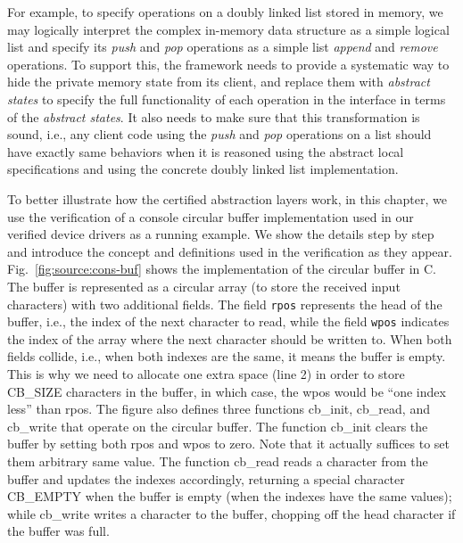 For example, to specify operations on a doubly
linked list stored in memory, we may logically interpret the complex in-memory
data structure as a simple logical list and specify its {\em push} and {\em pop}
operations as a simple list {\em append} and {\em remove} operations. To support
this, the framework needs to provide a systematic way to hide the private memory
state from its client, and replace them with {\em abstract states} to specify
the full functionality of each operation in the interface in terms of the {\em
abstract states}. It also needs to make sure that this transformation is
sound, i.e., any client code using the {\em push} and {\em pop} operations
on a list should have exactly same behaviors when it is reasoned using the
abstract local specifications and using the concrete doubly linked list
implementation.



To better illustrate how the certified abstraction layers work,
in this chapter, we use the verification of a console
circular buffer implementation used in our verified device drivers
as a running example. We show the details step by step and introduce
the concept and definitions used in the verification as they appear.
Fig.~\ref{fig:source:cons-buf} shows the implementation of the circular
buffer in C. The buffer is represented as a circular array
(to store the received input characters) with two additional
fields. The field \texttt{rpos} represents the head of the buffer,
i.e., the index of the next character to read, while the field
\texttt{wpos} indicates the index of the array where the next character
should be written to. When both fields collide, i.e., when both
indexes are the same, it means the buffer is empty. This is why we need
to allocate one extra space (line 2) in order to store \textsf{CB\_SIZE}
characters in the buffer, in which case, the \textsf{wpos} would be
``one index less'' than \textsf{rpos}. 
The figure also defines three functions
\textsf{cb\_init}, \textsf{cb\_read}, and \textsf{cb\_write} that operate
on the circular buffer. The function \textsf{cb\_init} clears the buffer
by setting both \textsf{rpos} and \textsf{wpos} to zero. Note that
it actually suffices to set them arbitrary same value. The function
\textsf{cb\_read} reads a character from the buffer and updates the
indexes accordingly, returning a special character \textsf{CB\_EMPTY}
when the buffer is empty (when the indexes have the same values);
while \textsf{cb\_write} writes a character to the buffer, chopping
off the head character if the buffer was full.

